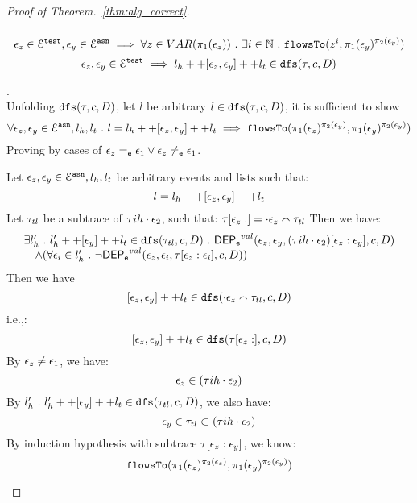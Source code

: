 \documentclass[a4paper,11pt]{article}
\begin{document}
\begin{proof}[Proof of Theorem.~\ref{thm:alg_correct}]
\begin{case}
\begin{equation}
\end{equation}
%
\begin{equation}
  \mathtt{\epsilon}_z \in \mathcal{E}^{\mathtt{{test}}}, \mathtt{\epsilon}_y \in \mathcal{E}^{\mathtt{{asn}}}
  \implies \forall z \in VAR(\pi_1(\mathtt{\epsilon}_z)) ~.~ \exists i \in\mathbb{N} ~.~
  \mathtt{flowsTo}(z^i, \pi_1(\mathtt{\epsilon}_y)^{\pi_2(\mathtt{\epsilon}_y)})
\end{equation}
%
\begin{equation}
  \mathtt{\epsilon}_z, \mathtt{\epsilon}_y \in \mathcal{E}^{\mathtt{{test}}}
  \implies l_h ++ [\mathtt{\epsilon}_z, \mathtt{\epsilon}_y] ++ l_t \in \mathtt{dfs}(\mathtt{\tau}, c, D)
\end{equation}
\begin{subcase}.
\\
Unfolding $\mathtt{dfs}(\mathtt{\tau}, c, D)$, let $l$ be arbitrary $l \in  \mathtt{dfs}(\mathtt{\tau}, c, D)$, it is sufficient to show 
\[
   \forall \mathtt{\epsilon}_z, \mathtt{\epsilon}_y \in \mathcal{E}^{\mathtt{{asn}}}, l_h, l_t ~.~ 
   l = l_h ++ [\mathtt{\epsilon}_z, \mathtt{\epsilon}_y] ++ l_t 
   \implies \mathtt{flowsTo}(\pi_1(\mathtt{\epsilon}_z)^{\pi_2(\mathtt{\epsilon}_y)}, \pi_1(\mathtt{\epsilon}_y)^{\pi_2(\mathtt{\epsilon}_y)})
\] 
%
Proving by cases of $\mathtt{\epsilon}_z =_{\mathtt{e}} \mathtt{\epsilon}_1 \lor \mathtt{\epsilon}_z \neq_{\mathtt{e}} \mathtt{\epsilon}_1$.
\begin{subsubcase}
Let $\mathtt{\epsilon}_z, \mathtt{\epsilon}_y \in \mathcal{E}^{\mathtt{{asn}}}, l_h, l_t$ be arbitrary events and lists such that:
\[
  l = l_h ++ [\mathtt{\epsilon}_z, \mathtt{\epsilon}_y] ++ l_t 
\]
Let $\mathtt{\tau}_{tl}$ be a subtrace  of $\mathtt{\tau}{ih} \cdot \mathtt{\epsilon}_2$, such that: 
$\mathtt{\tau}[\mathtt{\epsilon}_z:] = \cdot \mathtt{\epsilon}_z \smallfrown \mathtt{\tau}_{tl}$
Then we have:
\[
\begin{array}{l}
  \exists l_{h}' ~.~ l_{h}' ++ [\mathtt{\epsilon}_y] ++ l_t \in \mathtt{dfs}( \mathtt{\tau}_{tl}, c, D) ~.~
  \mathsf{DEP_{\mathtt{e}}}^{val}(\mathtt{\epsilon}_z, \mathtt{\epsilon}_y, (\mathtt{\tau}{ih} \cdot \mathtt{\epsilon}_2)[\mathtt{\epsilon}_z: \mathtt{\epsilon}_y], c, D)
  \\ \quad \land 
  (\forall \mathtt{\epsilon}_i \in l_{h}' ~.~ \neg \mathsf{DEP_{\mathtt{e}}}^{val} (\mathtt{\epsilon}_z, \mathtt{\epsilon}_i, \mathtt{\tau}[\mathtt{\epsilon}_z: \mathtt{\epsilon}_i], c, D))
\end{array}
\]
%
Then
we have
\[
  [\mathtt{\epsilon}_z, \mathtt{\epsilon}_y] ++ l_t 
  \in \mathtt{dfs}(\cdot \mathtt{\epsilon}_z \smallfrown \mathtt{\tau}_{tl}, c, D)
\]
i.e.,:
\[
  [\mathtt{\epsilon}_z, \mathtt{\epsilon}_y] ++ l_t 
  \in \mathtt{dfs}(\mathtt{\tau}[\mathtt{\epsilon}_z:], c, D)
\]
%
By $\mathtt{\epsilon}_z \neq \mathtt{\epsilon}_1$, we have:
\[
  \mathtt{\epsilon}_z \in (\mathtt{\tau}{ih} \cdot \mathtt{\epsilon}_2)
\]
%
By $l_{h}' ~.~ l_{h}' ++ [\mathtt{\epsilon}_y] ++ l_t \in \mathtt{dfs}( \mathtt{\tau}_{tl}, c, D)$, we also have:
%
\[
  \mathtt{\epsilon}_y \in \mathtt{\tau}_{tl} \subset (\mathtt{\tau}{ih} \cdot \mathtt{\epsilon}_2)
\]
%
By induction hypothesis with subtrace $\mathtt{\tau}[\mathtt{\epsilon}_z:\mathtt{\epsilon}_y]$, we know:
\[
  \mathtt{flowsTo}(\pi_1(\mathtt{\epsilon}_z)^{\pi_2(\mathtt{\epsilon}_z)}, \pi_1(\mathtt{\epsilon}_y)^{\pi_2(\mathtt{\epsilon}_y)})
\]
\end{subsubcase}
\end{subcase}
\end{case}
\end{proof}
\end{document}
